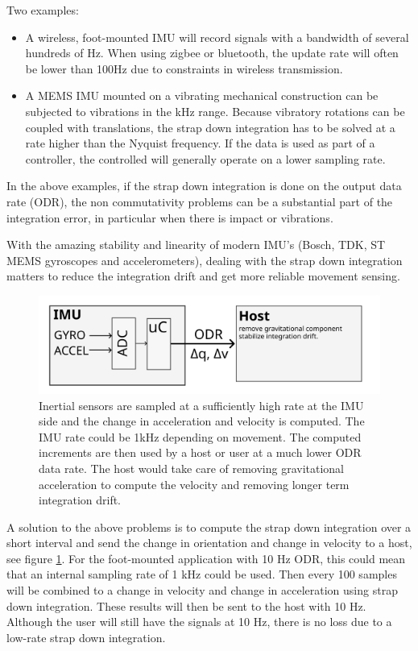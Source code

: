 \documentclass{article}
\begin{document}
Two examples:
\begin{itemize}
\item A wireless, foot-mounted IMU will record signals with a bandwidth of several hundreds of Hz. When using zigbee or bluetooth, the update rate will often be lower than 100Hz due to constraints in wireless transmission.
\item A MEMS IMU mounted on a vibrating mechanical construction can be subjected to vibrations in the kHz range. Because vibratory rotations can be coupled with translations, the strap down integration has to be solved at a rate higher than the Nyquist frequency. If the data is used as part of a controller, the controlled will generally operate on a lower sampling rate. 
\end{itemize}

In the above examples, if the strap down integration is done on the output data rate (ODR), the non commutativity problems can be a substantial part of the integration error, in particular when there is impact or vibrations.

With the amazing stability and linearity of modern IMU's (Bosch, TDK, ST MEMS gyroscopes and accelerometers), dealing with the strap down integration matters to reduce the integration drift and get more reliable movement sensing.

\begin{figure}[ht]
\includegraphics[scale=.8]{imu_and_host_diagram.png} 
\caption{Inertial sensors are sampled at a sufficiently high rate at the IMU side and the change in acceleration and velocity is computed. The IMU rate could be 1kHz depending on movement. The computed increments are then used by a host or user at a much lower ODR data rate. The host would take care of removing gravitational acceleration to compute the velocity and removing longer term integration drift.}
\centering
\label{fig:imu_host_diagram}
\end{figure}


A solution to the above problems is to compute the strap down integration over a short interval and send the change in orientation and change in velocity to a host, see figure \ref{fig:imu_host_diagram}. For the foot-mounted application with 10 Hz ODR, this could mean that an internal sampling rate of 1 kHz could be used. Then every 100 samples will be combined to a change in velocity and change in acceleration using strap down integration. These results will then be sent to the host with 10 Hz. Although the user will still have the signals at 10 Hz, there is no loss due to a low-rate strap down integration.
\end{document}

